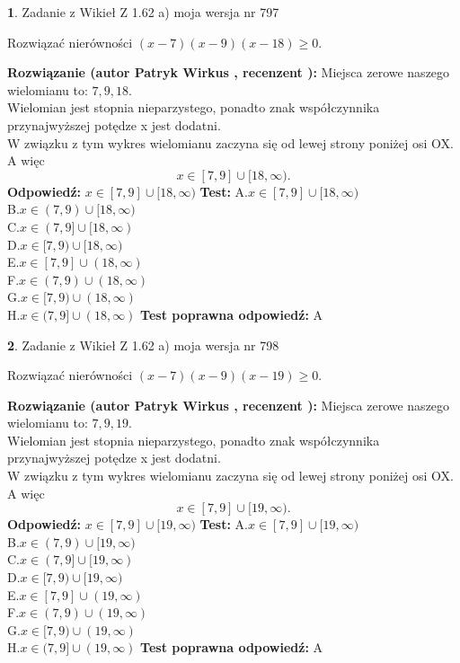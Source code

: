 \documentclass[12pt, a4paper]{article}
\theoremstyle{definition} %
\newtheorem{zad}{}
\newcommand{\zadStart}[1]{\begin{zad}#1\newline}
\newcommand{\zadStop}{\end{zad}}
\newcommand{\rozwStart}[2]{\noindent \textbf{Rozwiązanie (autor #1 , recenzent #2): }\newline}
\newcommand{\rozwStop}{\newline}
\newcommand{\odpStart}{\noindent \textbf{Odpowiedź:}\newline}
\newcommand{\odpStop}{\newline}
\newcommand{\testStart}{\noindent \textbf{Test:}\newline}
\newcommand{\testStop}{\newline}
\newcommand{\kluczStart}{\noindent \textbf{Test poprawna odpowiedź:}\newline}
\newcommand{\kluczStop}{\newline}
\begin{document}
\zadStart{Zadanie z Wikieł Z 1.62 a) moja wersja nr 797}

Rozwiązać nierówności $(x-7)(x-9)(x-18)\ge0$.
\zadStop
\rozwStart{Patryk Wirkus}{}
Miejsca zerowe naszego wielomianu to: $7, 9, 18$.\\
Wielomian jest stopnia nieparzystego, ponadto znak współczynnika przy\linebreak najwyższej potędze x jest dodatni.\\ W związku z tym wykres wielomianu zaczyna się od lewej strony poniżej osi OX. A więc $$x \in [7,9] \cup [18,\infty).$$
\rozwStop
\odpStart
$x \in [7,9] \cup [18,\infty)$
\odpStop
\testStart
A.$x \in [7,9] \cup [18,\infty)$\\
B.$x \in (7,9) \cup [18,\infty)$\\
C.$x \in (7,9] \cup [18,\infty)$\\
D.$x \in [7,9) \cup [18,\infty)$\\
E.$x \in [7,9] \cup (18,\infty)$\\
F.$x \in (7,9) \cup (18,\infty)$\\
G.$x \in [7,9) \cup (18,\infty)$\\
H.$x \in (7,9] \cup (18,\infty)$
\testStop
\kluczStart
A
\kluczStop



\zadStart{Zadanie z Wikieł Z 1.62 a) moja wersja nr 798}

Rozwiązać nierówności $(x-7)(x-9)(x-19)\ge0$.
\zadStop
\rozwStart{Patryk Wirkus}{}
Miejsca zerowe naszego wielomianu to: $7, 9, 19$.\\
Wielomian jest stopnia nieparzystego, ponadto znak współczynnika przy\linebreak najwyższej potędze x jest dodatni.\\ W związku z tym wykres wielomianu zaczyna się od lewej strony poniżej osi OX. A więc $$x \in [7,9] \cup [19,\infty).$$
\rozwStop
\odpStart
$x \in [7,9] \cup [19,\infty)$
\odpStop
\testStart
A.$x \in [7,9] \cup [19,\infty)$\\
B.$x \in (7,9) \cup [19,\infty)$\\
C.$x \in (7,9] \cup [19,\infty)$\\
D.$x \in [7,9) \cup [19,\infty)$\\
E.$x \in [7,9] \cup (19,\infty)$\\
F.$x \in (7,9) \cup (19,\infty)$\\
G.$x \in [7,9) \cup (19,\infty)$\\
H.$x \in (7,9] \cup (19,\infty)$
\testStop
\kluczStart
A
\kluczStop
\end{document}
